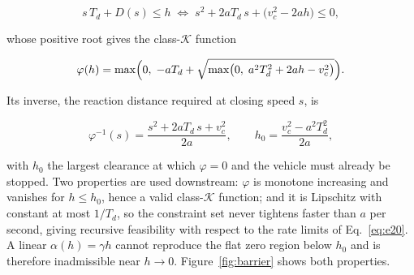 \documentclass[10pt,letterpaper]{article}
\begin{document}
\begin{equation}
    \label{eq:e13}
    s\,T_d+D(s)\le h
    \;\Longleftrightarrow\;
    s^2+2aT_d\,s+\bigl(v_c^2-2ah\bigr)\le 0 ,
\end{equation}

whose positive root gives the class-$\mathcal{K}$ function

\begin{equation}
    \label{eq:e14}
    \varphi(h)=\max\Bigl(0,\;-aT_d+\sqrt{\max\bigl(0,\;a^2T_d^2+2ah-v_c^2\bigr)}\Bigr).
\end{equation}

Its inverse, the reaction distance required at closing speed $s$, is

\begin{equation}
    \label{eq:e15}
    \varphi^{-1}(s)=\frac{s^2+2aT_d\,s+v_c^2}{2a},
    \qquad
    h_0=\frac{v_c^2-a^2T_d^2}{2a},
\end{equation}

with $h_0$ the largest clearance at which $\varphi=0$ and the vehicle must already be
stopped. Two properties are used downstream: $\varphi$ is monotone increasing and vanishes
for $h\le h_0$, hence a valid class-$\mathcal{K}$ function; and it is Lipschitz with
constant at most $1/T_d$, so the constraint set never tightens faster than $a$ per second,
giving recursive feasibility with respect to the rate limits of Eq.~\eqref{eq:e20}. A linear
$\alpha(h)=\gamma h$ cannot reproduce the flat zero region below $h_0$ and is therefore
inadmissible near $h\to 0$. Figure~\ref{fig:barrier} shows both properties.
\end{document}
